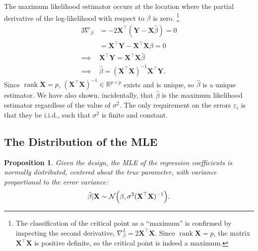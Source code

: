 \documentclass[letterpaper, reqno]{amsart}
\newtheorem{prop}{Proposition}[section]
\numberwithin{equation}{section}
\newcommand{\T}{\top} %
\newcommand{\vect}[1]{\boldsymbol{\mathbf{#1}}} %
\newcommand{\R}{\mathbb{R}}  %
\newcommand{\N}[2]{\mathcal{N}\mleft( #1, #2 \mright)}
\newcommand{\iid}{i.i.d.}
\newcommand{\Xm}{\vect{X}}
\newcommand{\Yv}{\vect{Y}}
\newcommand{\Bv}{\beta}
\newcommand{\Bvh}{\hat{\beta}}
\newcommand{\ve}{\varepsilon}
\DeclareMathOperator{\rank}{rank}
\begin{document}
The maximum likelihood estimator occurs at the location where the partial
derivative of the log-likelihood with respect to $\Bv$ is zero.%
\footnote{The classification of the critical point as a ``maximum'' is confirmed
  by inspecting the second derivative, $\nabla_\Bv^2 = 2\Xm^\T \Xm$. Since
  $\rank \Xm = p$, the matrix $\Xm^\T \Xm$ is positive definite, so the critical
  point is indeed a maximum.}
\begin{alignat*}{3}
  \nabla_\Bv &= -2\Xm^\T(\Yv - \Xm\Bvh) = 0 \\
  &= \Xm^\T\Yv - \Xm^\T\Xm\Bvh = 0 \\
  \implies &\Xm^\T\Yv = \Xm^\T\Xm\Bvh \\
  \implies &\Bvh = (\Xm^\T\Xm)^{-1}\Xm^\T\Yv.
\end{alignat*}
Since $\rank \Xm = p$, $(\Xm^\T\Xm)^{-1} \in \R^{p \times p}$ exists and is
unique, so $\Bvh$ is a unique estimator. We have also shown, incidentally, that
$\Bvh$ is the maximum likelihood estimator regardless of the value of
$\sigma^2$. The only requirement on the errors $\ve_i$ is that they be \iid, such
that $\sigma^2$ is finite and constant.

\subsection{The Distribution of the MLE} \label{sec:dist_mle}
\begin{prop}
  Given the design, the MLE of the regression coefficients is normally
  distributed, centered about the true parameter, with variance proportional to
  the error variance:
  \[ \Bvh|\Xm \sim \N{\Bv}{ \sigma^2 (\Xm^\T \Xm)^{-1}}. \]
\end{prop}
\end{document}

